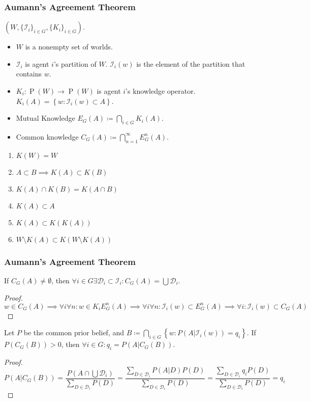 \documentclass[UTF8,aspectratio=43,11pt,colorlinks,compress,openany]{beamer}%
\begin{document}
\begin{frame}\frametitle{Aumann's Agreement Theorem}
$\left(W,\{\mathcal{I}_i\}_{i\in G},\{K_i\}_{i\in G}\right)$.
\begin{itemize}
\item $W$ is a nonempty set of worlds.\\
\item $\mathcal{I}_i$ is agent $i$'s partition of $W$. $\mathcal{I}_i(w)$ is the element of the partition that contains $w$.\\
\item $K_i: \operatorname{P}(W)\to \operatorname{P}(W)$ is agent $i$'s knowledge operator. 
$K_i(A)=\left\{w: \mathcal{I}_i(w)\subset A\right\}$.\\
\item Mutual Knowledge $E_G(A)\coloneqq \bigcap\limits_{i\in G}K_i(A)$.\\
\item Common knowledge $C_G(A)\coloneqq \bigcap\limits_{n=1}^\infty E_G^n(A)$.
\end{itemize}
\begin{enumerate}
	\item $K(W)=W$
	\item $A\subset B\implies K(A)\subset K(B)$
	\item $K(A)\cap K(B)=K(A\cap B)$
	\item $K(A)\subset A$
	\item $K(A)\subset K(K(A))$
	\item $W\setminus K(A)\subset K(W\setminus K(A))$
\end{enumerate}
\end{frame}

\begin{frame}\frametitle{Aumann's Agreement Theorem}
\setlength\abovedisplayskip{0pt}
\setlength\belowdisplayskip{0pt}
\begin{lemma}
If $C_G(A)\ne\emptyset$, then $\forall i\in G\exists \mathcal{D}_i\subset \mathcal{I}_i: C_G(A)=\bigcup \mathcal{D}_i$.
\end{lemma}
\begin{proof}
$w\in C_G(A)\implies\forall i\forall n: w\in K_iE_G^n(A)\implies\forall i\forall n: \mathcal{I}_i(w)\subset E_G^n(A)\implies\forall i: \mathcal{I}_i(w)\subset C_G(A)$
\end{proof}
\begin{theorem}
Let $P$ be the common prior belief, and $B\coloneqq \bigcap\limits_{i\in G}\left\{w: P(A|\mathcal{I}_i(w))=q_i\right\}$. If $P\left(C_G(B)\right)>0$, then $\forall i\in G: q_i=P(A|C_G(B))$.
\end{theorem}
\begin{proof}
\[P(A|C_G(B))=\frac{P(A\cap\bigcup \mathcal{D}_i)}{\sum\limits_{D\in\mathcal{D}_i}P(D)}=\frac{\sum\limits_{D\in \mathcal{D}_i}P(A|D)P(D)}{\sum\limits_{D\in \mathcal{D}_i}P(D)}=\frac{\sum\limits_{D\in\mathcal{D}_i}q_iP(D)}{\sum\limits_{D\in \mathcal{D}_i}P(D)}=q_i\]
\end{proof}
\end{frame}
\end{document}
